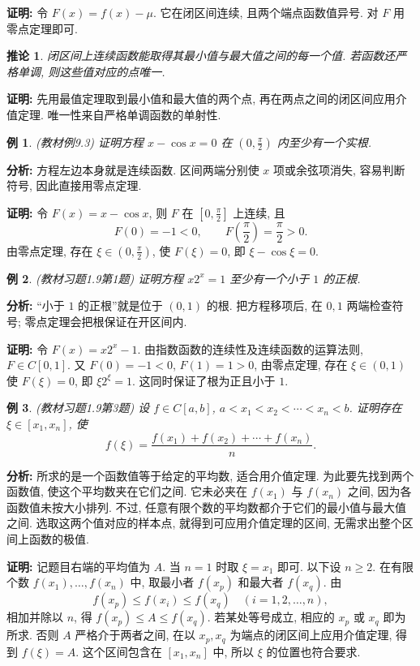\documentclass[UTF8,openany]{ctexbook}
\theoremstyle{chinesetextbook}
\newtheorem{example}{例}[section]
\newenvironment{cnproof}{\par\indent\textbf{证明:} \ignorespaces}{\par}
\newtheorem*{corollarysingle}{推论}
\begin{document}
\begin{cnproof}
令 $F(x)=f(x)-\mu$. 它在闭区间连续, 且两个端点函数值异号. 对 $F$ 用零点定理即可.
\end{cnproof}
\begin{corollarysingle}
闭区间上连续函数能取得其最小值与最大值之间的每一个值. 若函数还严格单调, 则这些值对应的点唯一.
\end{corollarysingle}
\begin{cnproof}
先用最值定理取到最小值和最大值的两个点, 再在两点之间的闭区间应用介值定理. 唯一性来自严格单调函数的单射性.
\end{cnproof}
\begin{example}
(教材例9.3) 证明方程 $x-\cos x=0$ 在 $\displaystyle(0,\frac\pi2)$ 内至少有一个实根.
\end{example}
\par\indent\textbf{分析:} 方程左边本身就是连续函数. 区间两端分别使 $x$ 项或余弦项消失, 容易判断符号, 因此直接用零点定理.
\begin{cnproof}
令 $F(x)=x-\cos x$, 则 $F$ 在 $\displaystyle[0,\frac\pi2]$ 上连续, 且
\[
F(0)=-1<0,\qquad F\!\left(\frac\pi2\right)=\frac\pi2>0.
\]
由零点定理, 存在 $\displaystyle\xi\in(0,\frac\pi2)$, 使 $F(\xi)=0$, 即 $\xi-\cos\xi=0$.
\end{cnproof}
\begin{example}
(教材习题1.9第1题) 证明方程 $x2^x=1$ 至少有一个小于 $1$ 的正根.
\end{example}
\par\indent\textbf{分析:} “小于 $1$ 的正根”就是位于 $(0,1)$ 的根. 把方程移项后, 在 $0,1$ 两端检查符号; 零点定理会把根保证在开区间内.
\begin{cnproof}
令 $F(x)=x2^x-1$. 由指数函数的连续性及连续函数的运算法则, $F\in C[0,1]$. 又 $F(0)=-1<0$, $F(1)=1>0$, 由零点定理, 存在 $\xi\in(0,1)$ 使 $F(\xi)=0$, 即 $\xi2^\xi=1$. 这同时保证了根为正且小于 $1$.
\end{cnproof}
\begin{example}
(教材习题1.9第3题) 设 $f\in C[a,b]$, $a<x_1<x_2<\cdots<x_n<b$. 证明存在 $\xi\in[x_1,x_n]$, 使
\[
f(\xi)=\frac{f(x_1)+f(x_2)+\cdots+f(x_n)}n.
\]
\end{example}
\par\indent\textbf{分析:} 所求的是一个函数值等于给定的平均数, 适合用介值定理. 为此要先找到两个函数值, 使这个平均数夹在它们之间. 它未必夹在 $f(x_1)$ 与 $f(x_n)$ 之间, 因为各函数值未按大小排列. 不过, 任意有限个数的平均数都介于它们的最小值与最大值之间. 选取这两个值对应的样本点, 就得到可应用介值定理的区间, 无需求出整个区间上函数的极值.
\begin{cnproof}
记题目右端的平均值为 $A$. 当 $n=1$ 时取 $\xi=x_1$ 即可. 以下设 $n\ge2$. 在有限个数 $f(x_1),\ldots,f(x_n)$ 中, 取最小者 $f(x_p)$ 和最大者 $f(x_q)$. 由
\[
f(x_p)\le f(x_i)\le f(x_q)\quad(i=1,2,\ldots,n),
\]
相加并除以 $n$, 得 $f(x_p)\le A\le f(x_q)$. 若某处等号成立, 相应的 $x_p$ 或 $x_q$ 即为所求. 否则 $A$ 严格介于两者之间, 在以 $x_p,x_q$ 为端点的闭区间上应用介值定理, 得到 $f(\xi)=A$. 这个区间包含在 $[x_1,x_n]$ 中, 所以 $\xi$ 的位置也符合要求.
\end{cnproof}
\end{document}
